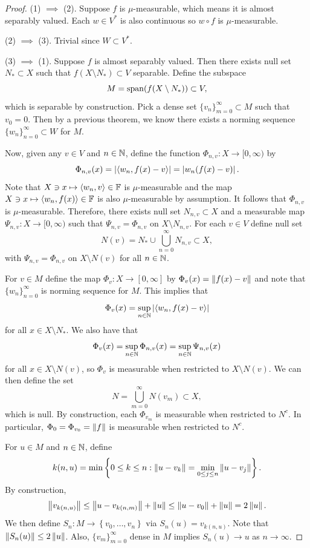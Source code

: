 \documentclass[a4paper]{article}
\renewcommand{\cupinfn}{\bigcup_{n=0}^\infty}
\renewcommand{\seqinfn}[1]{\{ #1 \}_{n=0}^\infty}
\renewcommand{\cupinfm}{\bigcup_{m=0}^\infty}
\renewcommand{\seqinfm}[1]{\{ #1 \}_{m=0}^\infty}
\begin{document}
\begin{proof}
  (1) $\implies$ (2). Suppose $f$ is $\mu$-measurable,
  which means it is almost separably valued.
  Each $w \in V^*$ is also continuous so
  $w \circ f$ is $\mu$-measurable.

  (2) $\implies$ (3). Trivial since $W \subset V^*$.

  (3) $\implies$ (1). Suppose $f$ is almost separably valued.
  Then there exists null set $N_* \subset X$ such that
  $f(X \setminus N_*) \subset V$ separable. Define the subspace
  \[
    M = \operatorname{span}(f(X \setminus N_*)) \subset V,
  \]
  which is separable by construction. Pick a dense set $\seqinfm{v_n}
  \subset M$ such that $v_0 = 0$. Then by a previous theorem, we know
  there exists a norming sequence $\seqinfn{w_n} \subset W$ for $M$.

  Now, given any $v \in V$ and $n \in \mathbb{N}$, define the function $\Phi_{n,
  v} : X \to [0, \infty)$ by
  \[
    \Phi_{n, v}(x) = \left\lvert \left\langle w_n, f(x) - v \right\rangle\right\rvert
    = \left\lvert w_n(f(x) - v)\right\rvert.
  \]
  Note that $X \ni x \mapsto \left\langle w_n, v \right\rangle \in \mathbb{F}$ is $\mu$-measurable
  and the map $X \ni x \mapsto \left\langle w_n, f(x) \right\rangle \in \mathbb{F}$ is also
  $\mu$-measurable by assumption. It follows that $\Phi_{n, v}$ is
  $\mu$-measurable. Therefore, there exists null set $N_{n, v} \subset X$
  and a measurable map $\Psi_{n, v} : X \to [0, \infty)$ such that
  $\Psi_{n, v} = \Phi_{n, v}$ on $X \setminus N_{n, v}$. For each $v \in
  V$ define null set
  \[
    N(v) = N_* \cup \cupinfn N_{n, v} \subset X,
  \]
  with $\Psi_{n, v} = \Phi_{n, v}$ on $X \setminus N(v)$ for all $n \in
  \mathbb{N}$.

  For $v \in M$ define the map $\Phi_v : X \to [0, \infty]$ by $\Phi_v(x)
  = \left\lVert f(x) - v\right\rVert$ and note that $\seqinfn{w_n}$ is norming sequence for
  $M$. This implies that
  \[
    \Phi_v(x) = \sup_{n \in \mathbb{N}} \left\lvert \left\langle w_n, f(x) - v \right\rangle\right\rvert
  \]
  for all $x \in X \setminus N_*$. We also have that
  \[
    \Phi_v(x) = \sup_{n \in \mathbb{N}} \Phi_{n, v}(x)
    = \sup_{n \in \mathbb{N}} \Psi_{n, v}(x)
  \]
  for all $x \in X \setminus N(v)$, so $\Phi_v$ is measurable when
  restricted to $X \setminus N(v)$. We can then define the set
  \[
    N = \cupinfm N(v_m) \subset X,
  \]
  which is null. By construction, each $\Phi_{v_m}$ is measurable when
  restricted to $N^c$. In particular, $\Phi_0 = \Phi_{v_0} = \left\lVert f\right\rVert$ is
  measurable when restricted to $N^c$.

  For $u \in M$ and $n \in \mathbb{N}$, define
  \[
    k(n, u) = \min \left\{ 0 \leq k \leq n :
    \left\lVert u - v_k\right\rVert = \min_{0 \leq j \leq n}
    \left\lVert u - v_j\right\rVert \right\}.
  \]
  By construction,
  \[
    \left\lVert v_{k(n, u)}\right\rVert
    \leq \left\lVert u - v_{k(n, m)}\right\rVert + \left\lVert u\right\rVert
    \leq \left\lVert u - v_0\right\rVert + \left\lVert u\right\rVert
    = 2\left\lVert u\right\rVert.
  \]
  We then define $S_n: M \to \left\{ v_0, \dots, v_n \right\}$ via $S_n(u)
  = v_{k(n, u)}$. Note that $\left\lVert S_n(u)\right\rVert \leq 2 \left\lVert u\right\rVert$. Also,
  $\seqinfm{v_m}$ dense in $M$ implies $S_n(u) \to u$ as $n \to \infty$.


\end{proof}
\end{document}
